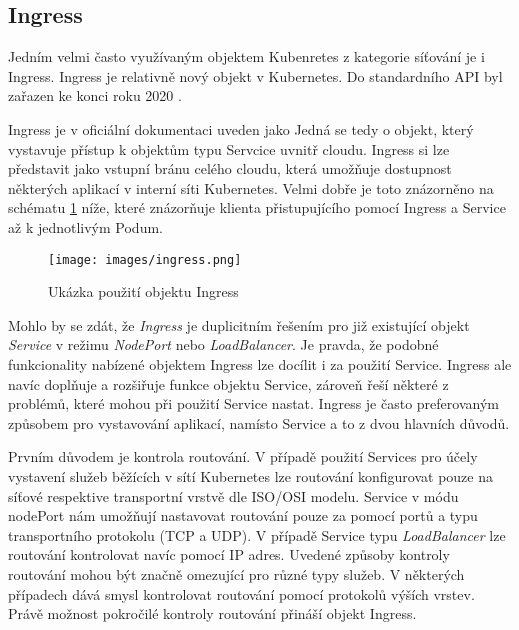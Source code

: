 \subsection{Ingress}
Jedním velmi často využívaným objektem Kubenretes z kategorie síťování je i Ingress. Ingress je relativně nový objekt v Kubernetes. Do standardního API byl zařazen ke konci roku 2020 \cite{k8scirobot_2020_merge}.

Ingress je v oficiální dokumentaci uveden jako  \cite{thekubernetesauthors_2023_ingress} Jedná se tedy o objekt, který vystavuje přístup k objektům typu Servcice uvnitř cloudu. Ingress si lze představit jako vstupní bránu celého cloudu, která umožňuje dostupnost některých aplikací v interní síti Kubernetes. Velmi dobře je toto znázorněno na schématu \ref{fig:ingres} níže, které znázorňuje klienta přistupujícího pomocí Ingress a Service až k jednotlivým Podum.

\begin{figure}[!ht]
    \centering
    \texttt{[image: images/ingress.png]}
    \caption[Ukázka použití objektu Ingress]{Ukázka použití objektu Ingress \cite{thekubernetesauthors_2023_ingressdiagram}}
    \label{fig:ingres}
\end{figure}

Mohlo by se zdát, že \textit{Ingress} je duplicitním řešením pro již existující objekt \textit{Service} v režimu \textit{NodePort} nebo \textit{LoadBalancer}. Je pravda, že podobné funkcionality nabízené objektem Ingress lze docílit i za použití Service. Ingress ale navíc doplňuje a rozšiřuje funkce objektu Service, zároveň řeší některé z problémů, které mohou při použití Service nastat. Ingress je často preferovaným způsobem pro vystavování aplikací, namísto Service a to z dvou hlavních důvodů.

Prvním důvodem je kontrola routování. V případě použití Services pro účely vystavení služeb běžících v sítí Kubernetes lze routování konfigurovat pouze na síťové respektive transportní vrstvě dle ISO/OSI modelu. Service v módu nodePort nám umožňují nastavovat routování pouze za pomocí portů a typu transportního protokolu (TCP a UDP). V případě Service typu \textit{LoadBalancer} lze routování kontrolovat navíc pomocí IP adres. Uvedené způsoby kontroly routování mohou být značně omezující pro různé typy služeb. V některých případech dává smysl kontrolovat routování pomocí protokolů výších vrstev. Právě možnost pokročilé kontroly routování přináší objekt Ingress.

